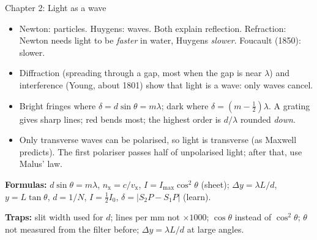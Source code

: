 \begin{summarybox}[fontupper=\small]{Chapter 2: Light as a wave}
\begin{itemize}[itemsep=0pt, topsep=2pt]
  \item Newton: particles. Huygens: waves. Both explain reflection. Refraction: Newton needs
        light to be \emph{faster} in water, Huygens \emph{slower}. Foucault (1850): slower.
  \item Diffraction (spreading through a gap, most when the gap is near $\lambda$) and
        interference (Young, about 1801) show that light is a wave: only waves cancel.
  \item Bright fringes where $\delta = d\sin\theta = m\lambda$; dark where
        $\delta = \left(m - \frac{1}{2}\right)\lambda$. A grating gives sharp lines; red bends
        most; the highest order is $d/\lambda$ rounded \emph{down}.
  \item Only transverse waves can be polarised, so light is transverse (as Maxwell predicts).
        The first polariser passes half of unpolarised light; after that, use Malus' law.
\end{itemize}
\textbf{Formulas:} $d\sin\theta = m\lambda$, $n_\mathrm{x} = c/v_\mathrm{x}$,
$I = I_\mathrm{max}\cos^2\theta$ (sheet); $\Delta y = \lambda L/d$, $y = L\tan\theta$,
$d = 1/N$, $I = \frac{1}{2}I_0$, $\delta = |S_2P - S_1P|$ (learn).
\par\textbf{Traps:} \textcolor{hscmistake}{\faTimes} slit width used for $d$;
\textcolor{hscmistake}{\faTimes} lines per \si{mm} not $\times 1000$;
\textcolor{hscmistake}{\faTimes} $\cos\theta$ instead of $\cos^2\theta$;
\textcolor{hscmistake}{\faTimes} $\theta$ not measured from the filter before;
\textcolor{hscmistake}{\faTimes} $\Delta y = \lambda L/d$ at large angles.
\end{summarybox}

